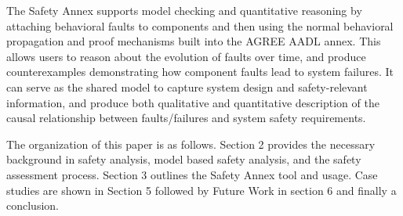 The Safety Annex supports model checking and quantitative reasoning by attaching behavioral faults to components and then using the normal behavioral propagation and proof mechanisms built into the AGREE AADL annex. This allows users to reason about the evolution of faults over time, and produce counterexamples demonstrating how component faults lead to system failures. It can serve as the shared model to capture system design and safety-relevant information, and produce both qualitative and quantitative description of the causal relationship between faults/failures and system safety requirements.

The organization of this paper is as follows. Section 2 provides the necessary background in safety analysis, model based safety analysis, and the safety assessment process. Section 3 outlines the Safety Annex tool and usage. Case studies are shown in Section 5 followed by Future Work in section 6 and finally a conclusion. 


%
